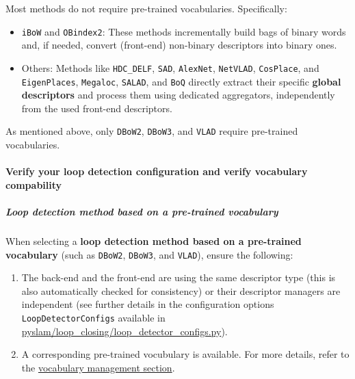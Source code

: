 \documentclass{article}
\let\oldparagraph\paragraph
\renewcommand{\paragraph}[1]{\oldparagraph{#1}\mbox{}}
\let\oldsubparagraph\subparagraph
\renewcommand{\subparagraph}[1]{\oldsubparagraph{#1}\mbox{}}
\begin{document}
Most methods do not require pre-trained vocabularies. Specifically:
\begin{itemize}
\item \texttt{iBoW} and \texttt{OBindex2}: These methods incrementally build
bags of binary words and, if needed, convert (front-end) non-binary
descriptors into binary ones. 
\item Others: Methods like \texttt{HDC\_DELF},
\texttt{SAD}, \texttt{AlexNet}, \texttt{NetVLAD}, \texttt{CosPlace}, and
\texttt{EigenPlaces}, \texttt{Megaloc}, \texttt{SALAD}, and \texttt{BoQ} directly extract their specific \textbf{global
descriptors} and process them using dedicated aggregators, independently
from the used front-end descriptors.
\end{itemize}

As mentioned above, only \texttt{DBoW2}, \texttt{DBoW3}, and
\texttt{VLAD} require pre-trained vocabularies.

\hypertarget{double-check-your-loop-detection-configuration-and-verify-vocabulary-compability}{%
\paragraph{Verify your loop detection configuration and verify
vocabulary
compability}\label{double-check-your-loop-detection-configuration-and-verify-vocabulary-compability}}

\hypertarget{loop-detection-method-based-on-a-pre-trained-vocabulary}{%
\subparagraph{Loop detection method based on a pre-trained
vocabulary}\label{loop-detection-method-based-on-a-pre-trained-vocabulary}}

When selecting a \textbf{loop detection method based on a pre-trained
vocabulary} (such as \texttt{DBoW2}, \texttt{DBoW3}, and \texttt{VLAD}),
ensure the following: 
\begin{enumerate}
\item The back-end and the front-end are using the
same descriptor type (this is also automatically checked for
consistency) or their descriptor managers are independent (see further
details in the configuration options \texttt{LoopDetectorConfigs}
available in \href{https://github.com/luigifreda/pyslam/blob/master/pyslam/loop_closing/loop_detector_configs.py}{pyslam/loop\_closing/loop\_detector\_configs.py}). 
\item A corresponding pre-trained vocubulary is available. For more details,
refer to the \protect\hyperlink{vocabulary-management}{vocabulary
management section}.
\end{enumerate}
\end{document}
